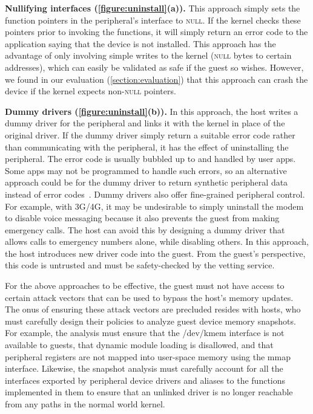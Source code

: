 \documentclass[pageno]{sig-alternate-05-2015}
\newcommand{\figref}[1]{\autoref{#1}}
\newcommand{\sectref}[1]{\autoref{#1}}
\newcommand{\emphitem}[1]{\textbf{#1}}
\newcommand*\circled[1]{\tikz[baseline=(char.base)]{
            \node[shape=circle,draw,inner sep=0.5pt] (char) {#1};}}
\newcounter{myctr}
\newenvironment{mylist}{\begin{list}{\textbf{\circled{\arabic{myctr}}}}
{\usecounter{myctr}
\setlength{\topsep}{1mm}\setlength{\itemsep}{0.5mm}
\setlength{\parsep}{0.5mm}
\setlength{\listparindent}{\parindent} %
\setlength{\itemindent}{0mm}\setlength{\partopsep}{0mm}
\setlength{\labelwidth}{-2mm}
\setlength{\leftmargin}{0mm}}}{\end{list}}
\newcommand{\code}[1]{{\sf #1}}
\newcommand{\addtext}[2]{#2}
\begin{document}
\begin{mylist} 
%
\item \emphitem{Nullifying interfaces (\figref{figure:uninstall}(a)).} This
approach simply sets the function pointers in the peripheral's interface to
\textsc{null}. If the kernel checks these pointers prior to invoking the
functions, it will simply return an error code to the application saying that
the device is not installed. This approach has the advantage of only involving
simple writes to the kernel (\textsc{null} bytes to certain addresses), which
can easily be validated as safe if the guest so wishes. However, we found in
our evaluation (\sectref{section:evaluation}) that this approach can crash the
device if the kernel expects non-\textsc{null} pointers.
%
\item \emphitem{Dummy drivers (\figref{figure:uninstall}(b)).} In this approach,
the host writes a dummy driver for the peripheral and links it with the kernel
in place of the original driver. If the dummy driver simply return a suitable
error code rather than communicating with the peripheral, it has the effect of
uninstalling the peripheral. The error code is usually bubbled up to and
handled by user apps. Some apps may not be programmed to handle such errors, so
an alternative approach could be for the dummy driver to return synthetic
peripheral data instead of error codes~\cite{mockdroid:hotmobile10}. Dummy
drivers also offer fine-grained peripheral control. For example, with
3G/4G, it may be undesirable to simply uninstall the modem to disable voice
messaging because it also prevents the guest from making emergency calls. The
host can avoid this by designing a dummy driver that allows calls to emergency
numbers alone, while disabling others. In this approach, the host introduces
new driver code into the guest. From the guest's perspective, this code is
untrusted and must be safety-checked by the vetting service.

\end{mylist}

\addtext{Tasks 10\&11}{For the above approaches to be effective, the guest must
not have access to certain attack vectors that can be used to bypass the host's
memory updates. The onus of ensuring these attack vectors are precluded resides
with hosts, who must carefully design their policies to analyze guest device
memory snapshots. For example, the analysis must ensure that the 
\code{/dev/kmem} interface is not available to guests, that dynamic module
loading is disallowed, and that peripheral registers are not mapped into
user-space memory using the \code{mmap} interface. Likewise, the snapshot
analysis must carefully account for all the interfaces exported by peripheral
device drivers and aliases to the functions implemented in them to ensure that
an unlinked driver is no longer reachable from any paths in the normal world
kernel.}
\end{document}
